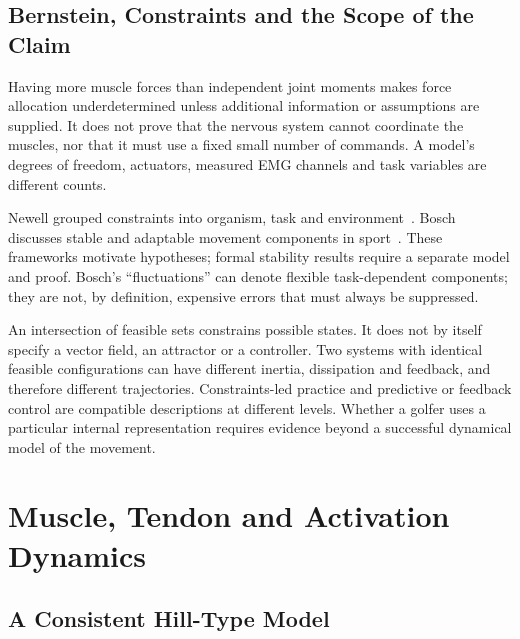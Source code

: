\subsection{Bernstein, Constraints and the Scope of the Claim}

Having more muscle forces than independent joint moments makes force allocation
underdetermined unless additional information or assumptions are supplied. It
does not prove that the nervous system cannot coordinate the muscles, nor that
it must use a fixed small number of commands. A model's degrees of freedom,
actuators, measured EMG channels and task variables are different counts.

Newell grouped constraints into organism, task and environment~\cite{Newell1986}.
Bosch discusses stable and adaptable movement components in
sport~\cite{Bosch2020,Bosch2015}.
These frameworks motivate hypotheses; formal stability results require a
separate model and proof. Bosch's ``fluctuations''
can denote flexible task-dependent components; they are not, by definition,
expensive errors that must always be suppressed.

An intersection of feasible sets constrains possible states. It does not by
itself specify a vector field, an attractor or a controller. Two systems with
identical feasible configurations can have different inertia, dissipation and
feedback, and therefore different trajectories. Constraints-led practice and
predictive or feedback control are compatible descriptions at different levels.
Whether a golfer uses a particular internal representation requires evidence
beyond a successful dynamical model of the movement.

\section{Muscle, Tendon and Activation Dynamics}

\subsection{A Consistent Hill-Type Model}


